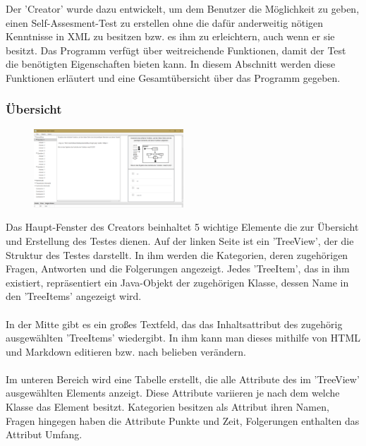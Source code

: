\label{Julian}

Der 'Creator' wurde dazu entwickelt, um dem Benutzer die Möglichkeit zu geben, einen Self-Assesment-Test zu erstellen ohne die dafür anderweitig nötigen Kenntnisse in XML zu besitzen bzw. es ihm zu erleichtern, auch wenn er sie besitzt. Das Programm verfügt über weitreichende Funktionen, damit der Test die benötigten Eigenschaften bieten kann. In diesem Abschnitt werden diese Funktionen erläutert und eine Gesamtübersicht über das Programm gegeben. 

\subsubsection*{Übersicht}
\begin{figure}[htbp] 
  \centering
     \includegraphics[width=0.5\textwidth]{Julian_Images/Creator-Uebersicht.png}
  \caption{}
  \label{fig:Bild0}
\end{figure}
Das Haupt-Fenster des Creators beinhaltet 5 wichtige Elemente die zur Übersicht und Erstellung des Testes dienen. Auf der linken Seite ist ein 'TreeView', der die Struktur des Testes darstellt. In ihm werden die Kategorien, deren zugehörigen Fragen, Antworten und die Folgerungen angezeigt. Jedes 'TreeItem', das in ihm existiert, repräsentiert ein Java-Objekt der zugehörigen Klasse, dessen Name in den 'TreeItems' angezeigt wird.
\\
\\
In der Mitte gibt es ein großes Textfeld, das das Inhaltsattribut des zugehörig ausgewählten 'TreeItems' wiedergibt. In ihm kann man dieses mithilfe von HTML und Markdown editieren bzw. nach belieben verändern.
\\
\\
Im unteren Bereich wird eine Tabelle erstellt, die alle Attribute des im 'TreeView'  ausgewählten Elements anzeigt. Diese Attribute variieren je nach dem welche Klasse das Element besitzt. Kategorien besitzen als Attribut ihren Namen, Fragen hingegen haben die Attribute Punkte und Zeit, Folgerungen enthalten das Attribut Umfang.
\\
\\
